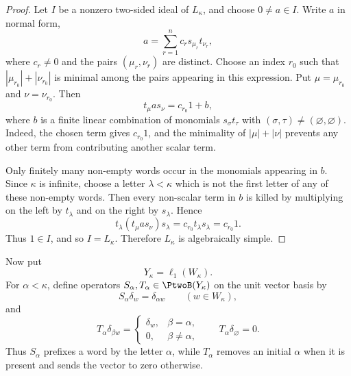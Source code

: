 \documentclass[11pt,reqno]{amsart}
\makeatletter
\theoremstyle{plain}
\theoremstyle{definition}
\newcounter{problempaper}
\newenvironment{problempaperbody}{%
  \setcounter{subsection}{0}%
  \setcounter{subsubsection}{0}%
  \setcounter{paragraph}{0}%
  \renewcommand{\thesubsection}{\arabic{subsection}}%
  \renewcommand{\thesubsubsection}{\thesubsection.\arabic{subsubsection}}%
  \renewcommand{\theparagraph}{\thesubsubsection.\arabic{paragraph}}%
  \let\problem@outersection\section
  \let\problem@outersubsection\subsection
  \let\problem@outersubsubsection\subsubsection
  \let\problem@outerparagraph\paragraph
  \let\section\problem@papersection
  \let\subsection\problem@papersubsection
  \let\subsubsection\problem@papersubsubsection
}{%
  \let\section\problem@outersection
  \let\subsection\problem@outersubsection
  \let\subsubsection\problem@outersubsubsection
  \let\paragraph\problem@outerparagraph
}
\newcommand{\problem@target}[2]{%
  \hypertarget{problem-\theproblempaper-#1-#2}{}%
}
\newcommand{\problem@paperheading}[3]{%
  \par\bigskip
  \problem@target{#1}{#2}%
  \noindent{\large\bfseries #2.\quad #3\par}%
  \nobreak\smallskip
}
\newcommand{\problem@papersubheading}[3]{%
  \par\medskip
  \problem@target{#1}{#2}%
  \noindent{\normalsize\bfseries #2.\quad #3\par}%
  \nobreak\smallskip
}
\newcommand{\problem@papersubsubheading}[3]{%
  \par\smallskip
  \problem@target{#1}{#2}%
  \noindent{\normalsize\itshape #2.\quad #3.\ }%
}
\def\problem@papersection{%
  \@ifstar{\problem@papersectionstar}{\problem@papersectionnostar}%
}
\def\problem@papersectionstar#1{%
  \par\bigskip\noindent{\large\bfseries #1\par}\nobreak\smallskip
}
\def\problem@papersectionnostar#1{%
  \refstepcounter{subsection}%
  \setcounter{subsubsection}{0}%
  \setcounter{paragraph}{0}%
  \problem@paperheading{section}{\thesubsection}{#1}%
  \problem@writecontentsline{section}{\thesubsection}{#1}%
}
\def\problem@papersubsection{%
  \@ifstar{\problem@papersubsectionstar}{\problem@papersubsectionnostar}%
}
\def\problem@papersubsectionstar#1{%
  \par\medskip\noindent{\normalsize\bfseries #1\par}\nobreak\smallskip
}
\def\problem@papersubsectionnostar#1{%
  \refstepcounter{subsubsection}%
  \setcounter{paragraph}{0}%
  \problem@papersubheading{subsection}{\thesubsubsection}{#1}%
  \problem@writecontentsline{subsection}{\thesubsubsection}{#1}%
}
\def\problem@papersubsubsection{%
  \@ifstar{\problem@papersubsubsectionstar}{\problem@papersubsubsectionnostar}%
}
\def\problem@papersubsubsectionstar#1{%
  \par\smallskip\noindent{\normalsize\itshape #1.\ }%
}
\def\problem@papersubsubsectionnostar#1{%
  \refstepcounter{paragraph}%
  \problem@papersubsubheading{subsubsection}{\theparagraph}{#1}%
  \problem@writecontentsline{subsubsection}{\theparagraph}{#1}%
}
\newcommand{\problem@writecontentsline}[3]{%
  \begingroup
  \protected@write\@auxout{}{%
    \string\problemcontentsentry{\theproblempaper}{#1}{#2}{#3}{\thepage}%
  }%
  \endgroup
}
\newcommand{\problemcontentsentry}[5]{%
  \@ifundefined{problemcontents@#1}{%
    \expandafter\gdef\csname problemcontents@#1\endcsname{}%
  }{}%
  \expandafter\g@addto@macro\csname problemcontents@#1\endcsname{%
    \problemcontentsline{#1}{#2}{#3}{#4}{#5}%
  }%
}
\newcommand{\problemcontentslink}[4]{%
  \hyperlink{problem-#1-#2-#3}{#4}%
}
\newcommand{\problemcontentsline}[5]{%
  \ifstrequal{#2}{section}{%
    \par\noindent
    \problemcontentslink{#1}{#2}{#3}{\makebox[2.5em][l]{#3}#4}%
    \nobreak\dotfill
    \problemcontentslink{#1}{#2}{#3}{#5}\par
  }{%
    \ifstrequal{#2}{subsection}{%
      \par\noindent\hspace*{1.5em}%
      \problemcontentslink{#1}{#2}{#3}{\makebox[3.5em][l]{#3}#4}%
      \nobreak\dotfill
      \problemcontentslink{#1}{#2}{#3}{#5}\par
    }{%
      \par\noindent\hspace*{3em}%
      \problemcontentslink{#1}{#2}{#3}{\makebox[4.5em][l]{#3}#4}%
      \nobreak\dotfill
      \problemcontentslink{#1}{#2}{#3}{#5}\par
    }%
  }%
}
\makeatother
\begin{document}
\begin{problempaperbody}
\begin{proof}
Let $I$ be a nonzero two-sided ideal of $L_\kappa$, and choose $0\ne a\in I$. Write $a$ in normal form,
\begin{equation*}
        a=\sum_{r=1}^{n} c_r s_{\mu_r}t_{\nu_r},
\end{equation*}
where $c_r\ne0$ and the pairs $(\mu_r,\nu_r)$ are distinct. Choose an index $r_0$ such that $|\mu_{r_0}|+|\nu_{r_0}|$ is minimal among the pairs appearing in this expression. Put $\mu=\mu_{r_0}$ and $\nu=\nu_{r_0}$. Then
\begin{equation*}
        t_\mu a s_\nu=c_{r_0}1+b,
\end{equation*}
where $b$ is a finite linear combination of monomials $s_\sigma t_\tau$ with $(\sigma,\tau)\ne(\varnothing,\varnothing)$. Indeed, the chosen term gives $c_{r_0}1$, and the minimality of $|\mu|+|\nu|$ prevents any other term from contributing another scalar term.

Only finitely many non-empty words occur in the monomials appearing in $b$. Since $\kappa$ is infinite, choose a letter $\lambda<\kappa$ which is not the first letter of any of these non-empty words. Then every non-scalar term in $b$ is killed by multiplying on the left by $t_\lambda$ and on the right by $s_\lambda$. Hence
\begin{equation*}
        t_\lambda(t_\mu a s_\nu)s_\lambda=c_{r_0}t_\lambda s_\lambda=c_{r_0}1.
\end{equation*}
Thus $1\in I$, and so $I=L_\kappa$. Therefore $L_\kappa$ is algebraically simple.
\end{proof}

Now put
\begin{equation*}
        Y_\kappa=\ell_1(W_\kappa).
\end{equation*}
For $\alpha<\kappa$, define operators $S_\alpha,T_\alpha\in\PtwoB(Y_\kappa)$ on the unit vector basis by
\begin{equation*}
        S_\alpha\delta_w=\delta_{\alpha w} \qquad(w\in W_\kappa),
\end{equation*}
and
\begin{equation*}
        T_\alpha\delta_{\beta w}=
        \begin{cases}
        \delta_w, & \beta=\alpha,\\
        0, & \beta\ne\alpha,
        \end{cases}
        \qquad
        T_\alpha\delta_\varnothing=0.
\end{equation*}
Thus $S_\alpha$ prefixes a word by the letter $\alpha$, while $T_\alpha$ removes an initial $\alpha$ when it is present and sends the vector to zero otherwise.


\end{problempaperbody}
\end{document}
